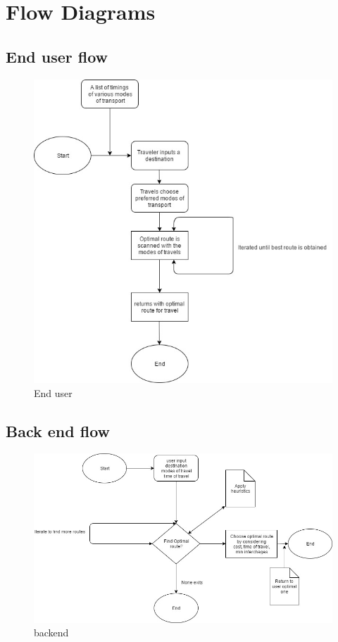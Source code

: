 \documentclass[12pt,a4paper]{article}
\begin{document}
\newpage

\section{Flow Diagrams}

\subsection{End user flow}
\begin{figure}[!hp]
    \centering
    \includegraphics[width=1.25\textwidth]{flowcharts/basicflow.jpg}
    \caption{End user}
    \label{fig:Enduser flow}
\end{figure}

\newpage

\subsection{Back end flow}

\begin{figure}[!hp]
    \centering
    \includegraphics[width=1.25\textwidth]{flowcharts/backend.jpg}
    \caption{backend}
    \label{fig:backend flow}
\end{figure}
\end{document}
